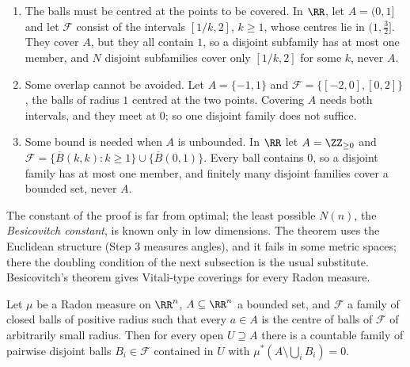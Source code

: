 \begin{counterexample}\label{radon-measures:counterexample-besicovitch}
\begin{enumerate}
\item The balls must be centred at the points to be covered. In $\RR$, let $A = (0, 1]$ and let $\mathcal{F}$ consist of the intervals $[1/k, 2]$, $k \geq 1$, whose centres lie in $(1, \frac32]$. They
cover $A$, but they all contain $1$, so a disjoint subfamily has at most one member, and $N$ disjoint subfamilies cover only $[1/k, 2]$ for some $k$, never $A$.
\item Some overlap cannot be avoided. Let $A = \{-1, 1\}$ and $\mathcal{F} = \{[-2, 0], [0, 2]\}$, the balls of radius $1$ centred at the two points. Covering $A$ needs both intervals, and they meet
at $0$; so one disjoint family does not suffice.
\item Some bound is needed when $A$ is unbounded. In $\RR$ let $A = \ZZ_{\geq 0}$ and $\mathcal{F} = \{\overline{B}(k, k) : k \geq 1\} \cup \{\overline{B}(0, 1)\}$. Every ball contains $0$, so a
disjoint family has at most one member, and finitely many disjoint families cover a bounded set, never $A$.
\end{enumerate}
\end{counterexample}

The constant of the proof is far from optimal; the least possible $N(n)$, the \emph{Besicovitch constant}, is known only in low dimensions. The theorem uses the Euclidean structure (Step 3
measures angles), and it fails in some metric spaces; there the doubling condition of the next subsection is the usual substitute. Besicovitch's theorem gives Vitali-type coverings for every
Radon measure.

\begin{corollary}\label{radon-measures:corollary-besicovitch-vitali}
Let $\mu$ be a Radon measure on $\RR^n$, $A \subseteq \RR^n$ a bounded set, and $\mathcal{F}$ a family of closed balls of positive radius such that every $a \in A$ is the centre of balls of
$\mathcal{F}$ of arbitrarily small radius. Then for every open $U \supseteq A$ there is a countable family of pairwise disjoint balls $B_i \in \mathcal{F}$ contained in $U$ with
$\mu^*(A \setminus \bigcup_iB_i) = 0$.
\end{corollary}

